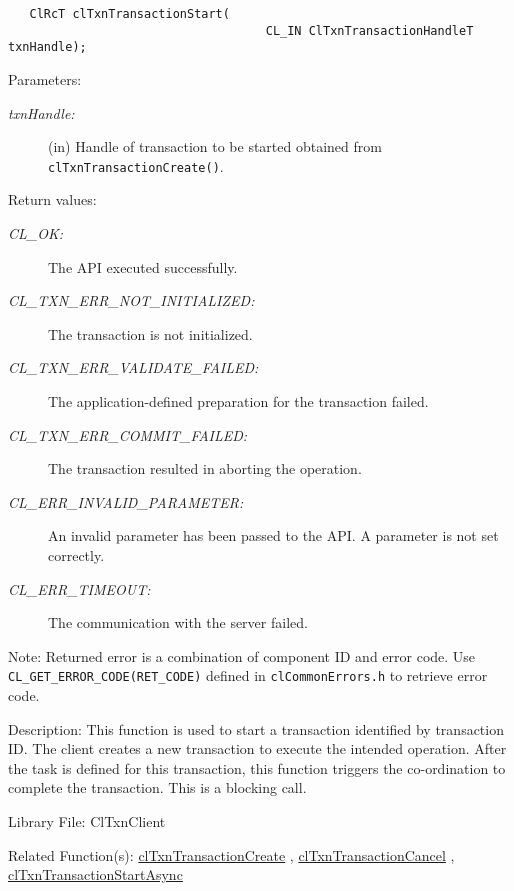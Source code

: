 \begin{flushleft}
\begin{Desc}
\footnotesize\begin{verbatim}   ClRcT clTxnTransactionStart(
                               		CL_IN ClTxnTransactionHandleT txnHandle);
\end{verbatim}
\normalsize
\end{Desc}
\begin{Desc}
\item[Parameters:]
\begin{description}
\item[{\em txn\-Handle:}](in) Handle of transaction to be started obtained from {\tt{clTxnTransactionCreate()}}.\end{description}
\end{Desc}
\begin{Desc}
\item[Return values:]
\begin{description}
\item[{\em CL\_\-OK:}]The API executed successfully. \item[{\em CL\_\-TXN\_\-ERR\_\-NOT\_\-INITIALIZED:}]The transaction is not initialized. 
\item[{\em CL\_\-TXN\_\-ERR\_\-VALIDATE\_\-FAILED:}]The application-defined preparation for the transaction failed. 
\item[{\em CL\_\-TXN\_\-ERR\_\-COMMIT\_\-FAILED:}]The transaction resulted in aborting the operation. 
\item[{\em CL\_\-ERR\_\-INVALID\_\-PARAMETER:}]An invalid parameter has been passed to the API. A parameter is not set correctly. 
\item[{\em CL\_\-ERR\_\-TIMEOUT:}]The communication with the server failed.\end{description}
\end{Desc}
\begin{Desc}
\item[Note:]Returned error is a combination of component ID and error code. Use {\tt{CL\_\-GET\_\-ERROR\_\-CODE(RET\_\-CODE)}} defined in 
{\tt{clCommonErrors.h}} to retrieve error code.\end{Desc}
\begin{Desc}
\item[Description:]This function is used to start a transaction identified by transaction ID. The client creates a new transaction to execute the 
intended operation. After the task is defined for this transaction, this function triggers the co-ordination to complete the transaction. This is a 
blocking call.\end{Desc}
\begin{Desc}
\item[Library File:]Cl\-Txn\-Client\end{Desc}
\begin{Desc}
\item[Related Function(s):]\hyperlink{pagetxn103}{cl\-Txn\-Transaction\-Create} , \hyperlink{pagetxn104}{cl\-Txn\-Transaction\-Cancel} ,
\hyperlink{pagetxn106}{cl\-Txn\-Transaction\-Start\-Async} \end{Desc}
\newpage



\end{flushleft}
